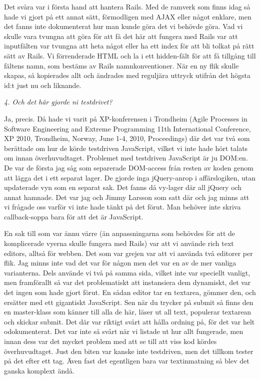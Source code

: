 \documentclass[11pt]{article}
\begin{document}
Det svåra var i första hand att hantera Rails. Med de ramverk som finns idag så hade vi gjort på ett annat sätt, förmodligen med AJAX eller något enklare, men det fanns inte dokumenterat hur man kunde göra det vi behövde göra. Vad vi skulle vara tvungna att göra för att få det här att fungera med Rails var att inputfälten var tvungna att heta något eller ha ett index för att bli tolkat på rätt sätt av Rails. Vi förrenderade HTML och la i ett hidden-fält för att få tillgång till fältens namn, som bestäms av Rails namnkonventioner. När en ny flik skulle skapas, så kopierades allt och ändrades med reguljära uttryck utifrån det högsta id:t just nu och liknande.

\emph{4. Och det här gjorde ni testdrivet?}

Ja, precis. Då hade vi varit på XP-konferensen i Trondheim (Agile Processes in Software Engineering and Extreme Programming 11th International Conference, XP 2010, Trondheim, Norway, June 1-4, 2010, Proceedings) där det var två som berättade om hur de körde testdriven JavaScript, vilket vi inte hade hört talats om innan överhuvudtaget. Problemet med testdriven JavaScript är ju DOM:en. De var de första jag såg som separerade DOM-access från resten av koden genom att lägga det i ett separat lager. De gjorde inga jQuery-anrop i affärslogiken, utan updaterade vyn som en separat sak. Det fanns då vy-lager där all jQuery och annat hamnade. Det var jag och Jimmy Larsson som satt där och jag minns att vi frågade oss varför vi inte hade tänkt på det förut. Man behöver inte skriva callback-soppa bara för att det är JavaScript.

En sak till som var ännu värre (än anpassningarna som behövdes för att de komplicerade vyerna skulle fungera med Rails) var att vi använde rich text editors, alltså för webben. Det som var grejen var att vi använda två editorer per flik. Jag minns inte vad det var för någon men det var en av de mer vanliga varianterna. Dels använde vi två på samma sida, vilket inte var speciellt vanligt, men framförallt så var det problematiskt att instansiera dem dynamiskt, det var det ingen som hade gjort förut. En sådan editor tar en textarea, gömmer den, och ersätter med ett gigantiskt JavaScript. Sen när du trycker på submit så finns den en master-klass som känner till alla de här, läser ut all text, populerar textarean och skickar submit. Det där var riktigt svårt att hålla ordning på, för det var helt odokumenterat. Det var inte så svårt när vi listade ut hur allt fungerade, men innan dess var det mycket problem med att se till att viss kod kördes överhuvudtaget. Just den biten var kanske inte testdriven, men det tillkom tester på det efter ett tag. Även fast det egentligen bara var textinmatning så blev det ganska komplext ändå.
\end{document}
